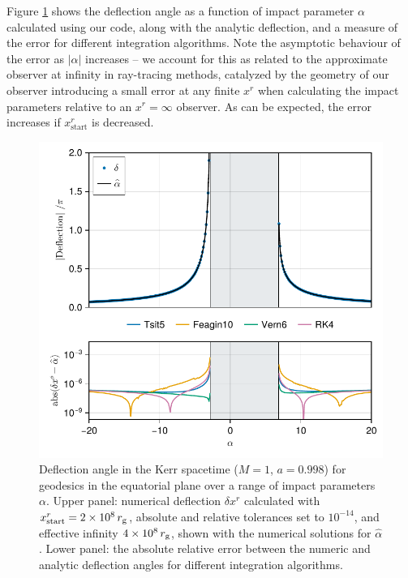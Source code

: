 \documentclass[fleqn,usenatbib]{mnras}
\begin{document}
Figure \ref{fig:deflection-angle} shows the deflection angle as a function of impact parameter $\alpha$ calculated using our code, along with the analytic deflection, and a measure of the error for different integration algorithms. Note the asymptotic behaviour of the error as $\lvert \alpha \rvert$ increases -- we account for this as related to the approximate observer at infinity in ray-tracing methods, catalyzed by the geometry of our observer introducing a small error at any finite $x^r$ when calculating the impact parameters relative to an $x^r = \infty$ observer. As can be expected, the error increases if $x^r_\text{start}$ is decreased.

\begin{figure}
	\centering
	\includegraphics[width=0.94\linewidth]{figures/deflection.iyer-hansen.pdf}
	\caption{Deflection angle in the Kerr spacetime ($M = 1$, $a = 0.998$) for geodesics in the equatorial plane over a range of impact parameters $\alpha$. Upper panel: numerical deflection $\delta x^r$ calculated with  $x^r_\text{start} = 2 \times 10^8 \, r_\text{g}$, absolute and relative tolerances set to $10^{-14}$, and effective infinity $4 \times 10^8\, r_\text{g}$, shown with the numerical solutions for $\hat{\alpha}$. Lower panel: the absolute relative error between the numeric and analytic deflection angles for different integration algorithms.}
	\label{fig:deflection-angle}
\end{figure}


\end{document}
